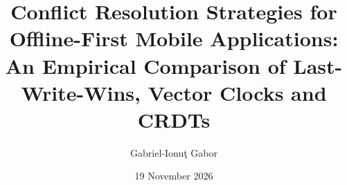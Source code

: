 \documentclass[11pt]{amsart}
\title[Conflict Resolution in Offline-First Apps]{Conflict Resolution Strategies for Offline-First
  Mobile Applications: An Empirical Comparison of Last-Write-Wins, Vector Clocks and CRDTs}
\author{Gabriel-Ionu\c{t} Gabor}
\date{19 November 2026} %
\theoremstyle{definition}
\theoremstyle{plain}
\begin{document}
\begin{abstract}

\end{abstract}

\maketitle











\end{document}
